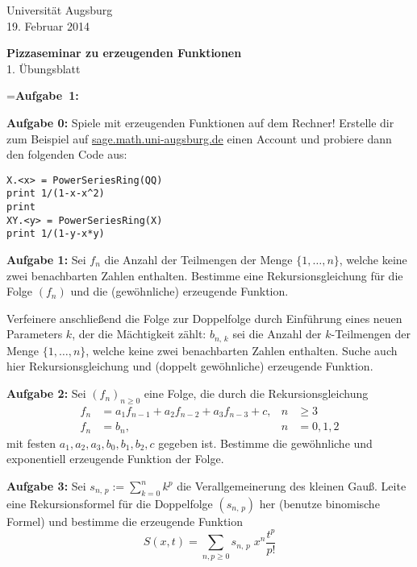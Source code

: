 \documentclass[a4paper,ngerman]{scrartcl}
\theoremstyle{definition}
\theoremstyle{plain}
\theoremstyle{remark}
\begin{document}
\vspace*{-4em}
\begin{flushright}Universität Augsburg \\ 19. Februar 2014\end{flushright}

\begin{center}\Large \textbf{Pizzaseminar zu erzeugenden Funktionen} \\
1. Übungsblatt
\end{center}
\vspace{2em}

\newbox{\mybox}
\setbox\mybox=\hbox{\textbf{Aufgabe 1:}}

\begin{list}{}{\wd\mybox \leftmargin\wd\mybox \itemsep 1.3em}
\item[\textbf{Aufgabe 0:}] Spiele mit erzeugenden Funktionen auf dem Rechner! Erstelle dir zum Beispiel auf \url{sage.math.uni-augsburg.de} einen Account und probiere dann den folgenden Code aus:
\begin{verbatim}
X.<x> = PowerSeriesRing(QQ)
print 1/(1-x-x^2)
print  
XY.<y> = PowerSeriesRing(X)
print 1/(1-y-x*y)
\end{verbatim} 

\item[\textbf{Aufgabe 1:}] Sei $f_n$ die Anzahl der Teilmengen der Menge $\{1,\ldots,n\}$, welche keine zwei benachbarten Zahlen enthalten. Bestimme eine Rekursionsgleichung für die Folge $(f_n)$ und die (gewöhnliche) erzeugende Funktion.

Verfeinere anschließend die Folge zur Doppelfolge durch Einführung eines neuen Parameters $k$, der die Mächtigkeit zählt: $b_{n,\,k}$ sei die Anzahl der $k$-Teilmengen der Menge $\{1,\ldots,n\}$, welche keine zwei benachbarten Zahlen enthalten. Suche auch hier Rekursionsgleichung und (doppelt gewöhnliche) erzeugende Funktion.
\item[\textbf{Aufgabe 2:}] Sei $(f_n)_{n\geq 0}$ eine Folge, die durch die Rekursionsgleichung 
\begin{align*}
f_n &= a_1f_{n-1} + a_2f_{n-2} + a_3f_{n-3} + c, & n &\geq 3 \\
f_n &= b_n , & n &= 0,1,2
\end{align*}
mit festen $a_1, a_2, a_3, b_0, b_1, b_2, c$ gegeben ist. Bestimme die gewöhnliche und exponentiell erzeugende Funktion der Folge.

\item[\textbf{Aufgabe 3:}] Sei $s_{n,\,p} := \sum_{k=0}^n k^p$ die Verallgemeinerung des kleinen Gauß. Leite eine Rekursionsformel für die Doppelfolge $(s_{n,\,p})$ her (benutze binomische Formel) und bestimme die erzeugende Funktion 
$$ S(x,t) = \sum_{n,p \geq 0} s_{n,\,p}\;x^n\frac{t^p}{p!}
$$
\end{list}
\end{document}
